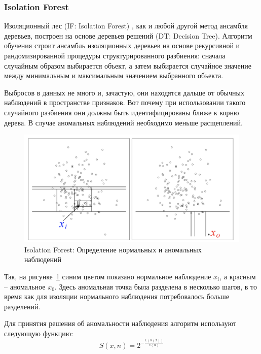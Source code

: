 \documentclass[12pt]{article}
\begin{document}
    \subsubsection{Isolation Forest}
    \label{sec:Research:Model:IsolationForest}

    \par Изоляционный лес (IF: Isolation Forest) \cite{IsolationForest}, как и любой другой метод ансамбля деревьев, построен на основе деревьев решений (DT: Decision Tree). Алгоритм обучения строит ансамбль изоляционных деревьев на основе рекурсивной и рандомизированной процедуры структурированного разбиения: сначала случайным образом выбирается объект, а затем выбирается случайное значение между минимальным и максимальным значением выбранного объекта.

    \par Выбросов в данных не много и, зачастую, они находятся дальше от обычных наблюдений в пространстве признаков. Вот почему при использовании такого случайного разбиения они должны быть идентифицированы ближе к корню дерева. В случае аномальных наблюдений необходимо меньше расщеплений.

    \begin{figure}[h!]
        \centering
        \includegraphics[width=0.8\linewidth]{IsolationForest.png}
        \caption{Isolation Forest: Определение нормальных и аномальных наблюдений}
        \label{sec:Research:Model:IsolationForest:fig:IsolationForest}
    \end{figure}

    \par Так, на рисунке~\ref{sec:Research:Model:IsolationForest:fig:IsolationForest} синим цветом показано нормальное наблюдение $x_i$, а красным -- аномальное $x_0$. Здесь аномальная точка была разделена в несколько шагов, в то время как для изоляции нормального наблюдения потребовалось больше разделений.

    \par Для принятия решения об аномальности наблюдения алгоритм используют следующую функцию:
    \begin{equation}
    \label{sec:Research:Model:IsolationForest:formula:IF}
        S(x,n) = 2^{-\frac{\mathsf{E}(h(x))}{c(n)}}
    \end{equation}
\end{document}
